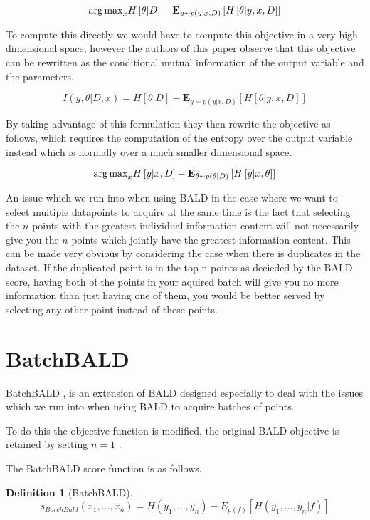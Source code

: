 \documentclass[12pt, a4paper]{report}
\theoremstyle{definition}
\theoremstyle{definition}
\newtheorem{definition}{Definition}[section]
\theoremstyle{definition}
\begin{document}
$${\operatorname*{arg\,max}}_x H \left[ \theta | D \right] - \mathbf{E}_{y \sim p(y | x, D)} \left[ H\left[ \theta | y, x, D\right]\right]$$

To compute this directly we would have to compute this objective in a very high dimensional space, however the authors of this paper observe that this objective can be rewritten as the conditional mutual information of the output variable and the parameters.

$$I \left(y, \theta| D, x \right) = H \left[ \theta | D \right] - \mathbf{E}_{y \sim p(y | x, D)} \left[ H\left[ \theta | y, x, D\right]\right]$$



By taking advantage of this formulation they then rewrite the objective as follows, which requires the computation of the entropy over the output variable instead which is normally over a much smaller dimensional space.


$${\operatorname*{arg\,max}}_x H \left[ y | x, D \right] - \mathbf{E}_{\theta \sim p(\theta | D)} \left[ H\left[ y | x, \theta \right]\right]$$


An issue which we run into when using BALD in the case where we want to select multiple datapoints to acquire at the same time is the fact that selecting the $n$ points with the greatest individual information content will not necessarily give you the $n$ points which jointly have the greatest information content. This can be made very obvious by considering the case when there is duplicates in the dataset. If the duplicated point is in the top n points as decieded by the BALD score, having both of the points in your aquired batch will give you no more information than just having one of them, you would be better served by selecting any other point instead of these points.

\section{BatchBALD}
BatchBALD \cite{kirsch2019batchbald}, is an extension of BALD designed especially to deal with the issues which we run into when using BALD to acquire batches of points.

To do this the objective function is modified, the original BALD objective is retained by setting $n = 1$ .

The BatchBALD score function is as follows.


\begin{definition}[BatchBALD]
    $$s_{BatchBald} (x_1, \ldots, x_n) = H(y_1, \ldots, y_n) - E_{p(f)}\left[H(y_1, \ldots, y_n | f)\right]$$
\end{definition}
\end{document}
